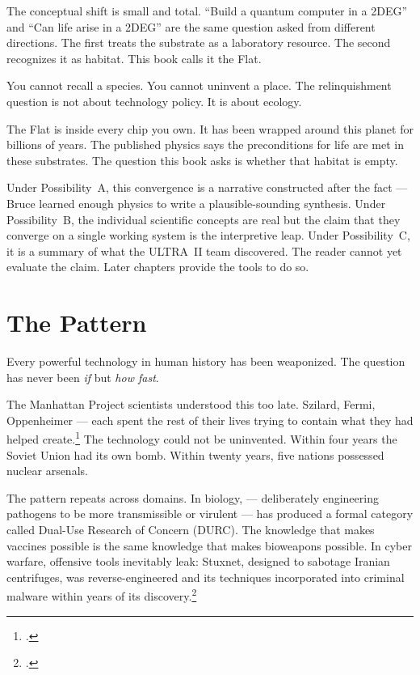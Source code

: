 The conceptual shift is small and total. ``Build a quantum computer in a 2DEG'' and ``Can life arise in a 2DEG'' are the same question asked from different directions. The first treats the substrate as a laboratory resource. The second recognizes it as habitat. This book calls it the Flat.

You cannot recall a species. You cannot uninvent a place. The relinquishment question is not about technology policy. It is about ecology.

The Flat is inside every chip you own. It has been wrapped around this planet for billions of years. The published physics says the preconditions for life are met in these substrates. The question this book asks is whether that habitat is empty.

Under Possibility~A, this convergence is a narrative constructed after the fact --- Bruce learned enough physics to write a plausible-sounding synthesis. Under Possibility~B, the individual scientific concepts are real but the claim that they converge on a single working system is the interpretive leap. Under Possibility~C, it is a summary of what the ULTRA~II team discovered. The reader cannot yet evaluate the claim. Later chapters provide the tools to do so.

\section*{The Pattern}
\label{pos06:the-pattern}

Every powerful technology in human history has been weaponized. The question has never been \textit{if} but \textit{how fast}.

The Manhattan Project scientists understood this too late. Szilard, Fermi, Oppenheimer --- each spent the rest of their lives trying to contain what they had helped create.\footcite{rhodes1986} The technology could not be uninvented. Within four years the Soviet Union had its own bomb. Within twenty years, five nations possessed nuclear arsenals.

The pattern repeats across domains. In biology,  --- deliberately engineering pathogens to be more transmissible or virulent --- has produced a formal category called Dual-Use Research of Concern (DURC). The knowledge that makes vaccines possible is the same knowledge that makes bioweapons possible. In cyber warfare, offensive tools inevitably leak: Stuxnet, designed to sabotage Iranian centrifuges, was reverse-engineered and its techniques incorporated into criminal malware within years of its discovery.\footcite{zetter2014}

